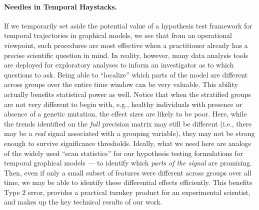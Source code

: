 \paragraph{Needles in Temporal Haystacks.} If we temporarily set aside the potential value of a hypothesis test framework for temporal 
trajectories in graphical models, we see that
from an operational viewpoint, such procedures are most effective when a practitioner already has a precise scientific question in mind. In reality, however, 
many data analysis tools are deployed for exploratory analyses to inform an investigator as to which questions to ask. 
Being able to ``localize'' which parts of the model are different across groups over the entire time window can be very valuable. This ability actually 
benefits statistical power as well. Notice that when the stratified groups are not very different 
to begin with, e.g., healthy individuals with presence or absence of a genetic mutation, the
effect sizes are likely to be poor.
Here, while the trends identified on the {\em full} precision matrix may still be different (i.e., there may be a {\em real} signal 
associated with a grouping variable), 
they may not be strong enough to survive significance thresholds. Ideally, what we need here are analogs of the widely used ``scan statistics'' 
for our hypothesis testing formulations for temporal graphical models --- to identify which {\em parts of the signal} are promising. 
Then, even if only a small subset of 
features were different across groups over all time,
we may be able to identify these differential effects efficiently. This benefits Type 2 error, 
provides a practical turnkey product for an experimental scientist, and makes up the key technical results of our work.


